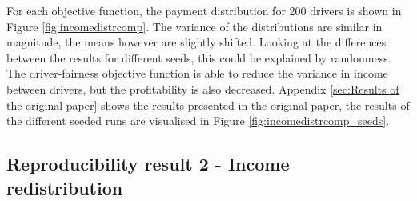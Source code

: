 For each objective function, the payment distribution for 200 drivers is shown in Figure \ref{fig:incomedistrcomp}. The variance of the distributions are similar in magnitude, the means however are slightly shifted. Looking at the differences between the results for different seeds, this could be explained by randomness. The driver-fairness objective function is able to reduce the variance in income between drivers, but the profitability is also decreased. Appendix \ref{sec:Results of the original paper}  shows the results presented in the original paper, the results of the different seeded runs are visualised in Figure \ref{fig:incomedistrcomp_seeds}.





\subsection{Reproducibility result 2 - Income redistribution}

